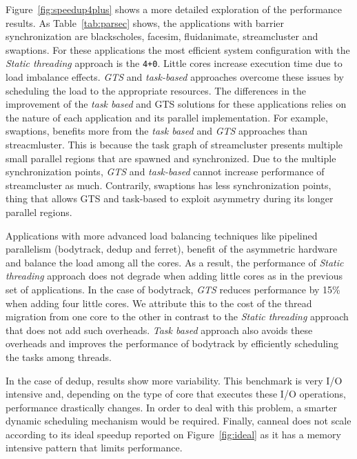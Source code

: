 Figure~\ref{fig:speedup4plus} shows a more detailed exploration of the performance results. 
As Table~\ref{tab:parsec} shows, the applications with barrier synchronization are blackscholes, facesim, fluidanimate, streamcluster and swaptions. 
For these applications the most efficient system configuration with the \emph{Static threading} approach is the \texttt{4+0}. 
Little cores increase execution time due to load imbalance effects. 
\emph{GTS} and \emph{task-based} approaches overcome these issues by scheduling the load to the appropriate resources. 
	The differences in the improvement of the \emph{task based} and GTS solutions for these applications relies on the nature of each application and its parallel implementation.
	For example, swaptions, benefits more from the \emph{task based} and \emph{GTS} approaches than streacmluster.  
	This is because the task graph of streamcluster presents multiple small parallel regions that are spawned and synchronized. 
	Due to the multiple synchronization points, \emph{GTS} and \emph{task-based} cannot increase performance of streamcluster as much. 
	Contrarily, swaptions has less synchronization points, thing that allows GTS and task-based to exploit asymmetry during its longer parallel regions.




Applications with more advanced load balancing techniques like pipelined parallelism (bodytrack, dedup and ferret), benefit of the asymmetric hardware and balance the load among all the cores. 
As a result, the performance of \emph{Static threading} approach does not degrade when adding little cores as in the previous set of applications.
In the case of bodytrack, \emph{GTS} reduces performance by 15\% when 
adding four little cores. 
We attribute this to the cost of the thread migration from one core to the 
other in contrast to the \emph{Static threading} approach that does not add such overheads.
\emph{Task based} approach also avoids these overheads and improves the performance of bodytrack by efficiently scheduling the tasks among threads.

In the case of dedup, results show more variability. This benchmark is very I/O intensive and, depending on the type of core that executes these I/O operations, performance drastically changes. In order to deal with this problem, a smarter dynamic scheduling mechanism would be required. 
Finally, canneal does not scale according to its ideal speedup reported on Figure~\ref{fig:ideal} as it has a memory intensive pattern that limits performance.

